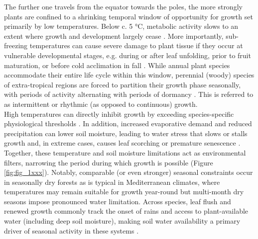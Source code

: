 \documentclass{article}
\begin{document}
		The further one travels from the equator towards the poles, the more strongly plants are confined to a shrinking temporal window of opportunity for growth set primarily by low temperatures. Below c. 5 °C, metabolic activity slows to an extent where growth and development largely cease \citep{schenkerPhysiologicalMinimumTemperatures2014, rossiCriticalTemperaturesXylogenesis2008, kornerWinterCropGrowth2008}. More importantly, sub-freezing temperatures can cause severe damage to plant tissue if they occur at vulnerable developmental stages, e.g. during or after leaf unfolding, prior to fruit maturation, or before cold acclimation in fall \citep{sakaiFreezingInjuriesPlants1987c, baumgartenNoRiskNo2023a}. 
		While annual plant species accommodate their entire life cycle within this window, perennial (woody) species of extra-tropical regions are forced to partition their growth phase seasonally, with periods of activity alternating with periods of dormancy \citep{delpierreTemperateBorealForest2016}. This is referred to as intermittent or rhythmic (as opposed to continuous) growth. \\

	High temperatures can directly inhibit growth by exceeding species-specific physiological thresholds \citep{osullivanThermalLimitsLeaf2017}. In addition, increased evaporative demand and reduced precipitation can lower soil moisture, leading to water stress that slows or stalls growth and, in extreme cases, causes leaf scorching or premature senescence \citep{hsiaoPlantResponsesWater1973, pugnaireConstraintsWaterStress1999, etzoldNumberGrowthDays2021, estiarteAlterationPhenologyLeaf2015a}. Together, these temperature and soil moisture limitations act as environmental filters, narrowing the period during which growth is possible (Figure \ref{fig:fig_1xxx}).
 Notably, comparable (or even stronger) seasonal constraints occur in seasonally dry forests as is typical in Mediterranean climates, where temperatures may remain suitable for growth year-round but multi-month dry seasons impose pronounced water limitation. Across species, leaf flush and renewed growth commonly track the onset of rains and access to plant-available water (including deep soil moisture), making soil water availability a primary driver of seasonal activity in these systems \citep{borchertSoilStemWater1994, ramosMultiscalePhenologySeasonally2023, alvaradoCambialActivityFive2025}.\\
 
	
		
\end{document}
